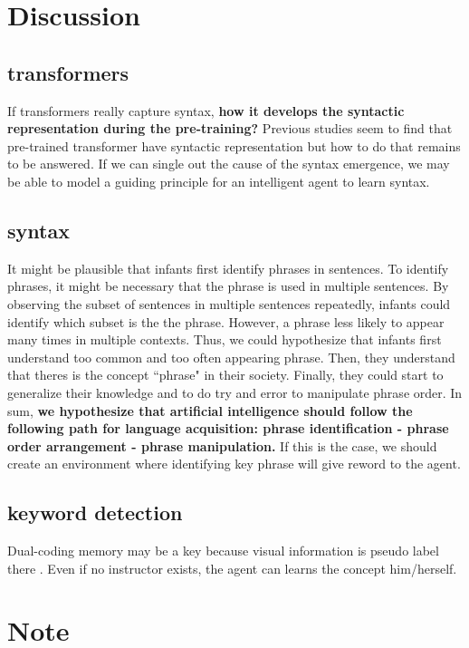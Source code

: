 \documentclass[12pt]{article}
\begin{document}
\section{Discussion}
\subsection{transformers}
If transformers really capture syntax, \textbf{how it develops the syntactic representation during the pre-training? }
Previous studies seem to find that pre-trained transformer have syntactic representation but how to do that remains 
to be answered. If we can single out the cause of the syntax emergence, we may be able to model a guiding principle 
for an intelligent agent to learn syntax.

\subsection{syntax}
It might be plausible that infants first identify phrases in sentences. To identify phrases, it might be necessary 
that the phrase is used in multiple sentences. By observing the subset of sentences in multiple sentences repeatedly, 
infants could identify which subset is the the phrase. However, a phrase less likely to appear many times in multiple contexts. 
Thus, we could hypothesize that infants first understand too common and too often appearing phrase. Then, they 
understand that theres is the concept ``phrase" in their society. Finally, they could start to generalize their knowledge 
and to do try and error to manipulate phrase order. In sum,\textbf{ we hypothesize that artificial intelligence should 
follow the following path for language acquisition: phrase identification - phrase order arrangement - phrase manipulation. }
If this is the case, we should create an environment where identifying key phrase will give reword to the agent. 

\subsection{keyword detection}
Dual-coding memory may be a key because visual information is pseudo label there \cite{Hill21}.
Even if no instructor exists, the agent can learns the concept him/herself.


\section{Note}



\end{document}
